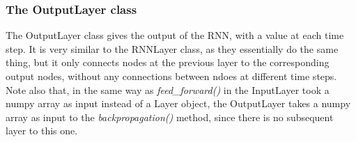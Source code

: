 \documentclass[11pt]{article}
\begin{document}
    \subsubsection{The OutputLayer class}\label{the-outputlayer-class}

    The OutputLayer class gives the output of the RNN, with a value at each
time step. It is very similar to the RNNLayer class, as they essentially
do the same thing, but it only connects nodes at the previous layer to
the corresponding output nodes, without any connections between ndoes at
different time steps. Note also that, in the same way as
\emph{feed\_forward()} in the InputLayer took a numpy array as input
instead of a Layer object, the OutputLayer takes a numpy array as input
to the \emph{backpropagation()} method, since there is no subsequent
layer to this one.
\end{document}
